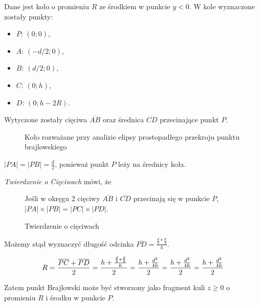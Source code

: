 \documentclass[12pt,a4paper]{article}
\begin{document}
Dane jest koło o promieniu $R$ ze środkiem w punkcie $y<0$.
W kole wyznaczone zostały punkty:
\begin{itemize}
\item $P$: $(0; 0)$,
\item $A$: $(-d/2; 0)$,
\item $B$: $(d/2; 0)$,
\item $C$: $(0; h)$,
\item $D$: $(0; h-2R)$.
\end{itemize}

Wytyczone zostały cięciwa $\overline{AB}$ oraz średnica $\overline{CD}$ przecinające punkt $P$.

\begin{figure}
\centering
{}
\caption{Koło rozważane przy analizie elipsy prostopadłego przekroju punktu brajlowskiego}
\end{figure}

$ \left| PA \right| = \left| PB \right| = \frac{d}{2}$, ponieważ punkt $P$ leży na średnicy koła.

\emph{Twierdzenie o Cięciwach} \cite{chords} mówi, że

\begin{figure}
Jeśli w okręgu 2 cięciwy $\overline{AB}$ i $\overline{CD}$ przecinają się w punkcie $P$,
$ \left|PA\right| \times \left| PB \right| = \left| PC \right| \times \left| PD \right| $.
\caption{Twierdzenie o cięciwach}
\end{figure}

Możemy stąd wyznaczyć długość odcinka
$\overline{PD} = \frac{\frac{d}{2} * \frac{d}{2}}{h}$.

$$
R = \frac{\overline{PC} + \overline{PD}}{2} =
\frac{h + \frac{\frac{d}{2} * \frac{d}{2}}{h}}{2} = \\
\frac{h + \frac{d^2}{4h}}{2} = \\
\frac{h + \frac{d^2}{4h}}{2} = \\
\frac{h + \frac{d^2}{4h}}{2}
$$

Zatem punkt Brajlowski może być stworzony jako fragment kuli $z \geq 0$ o promieniu $R$ i środku w punkcie $P$.
\end{document}
